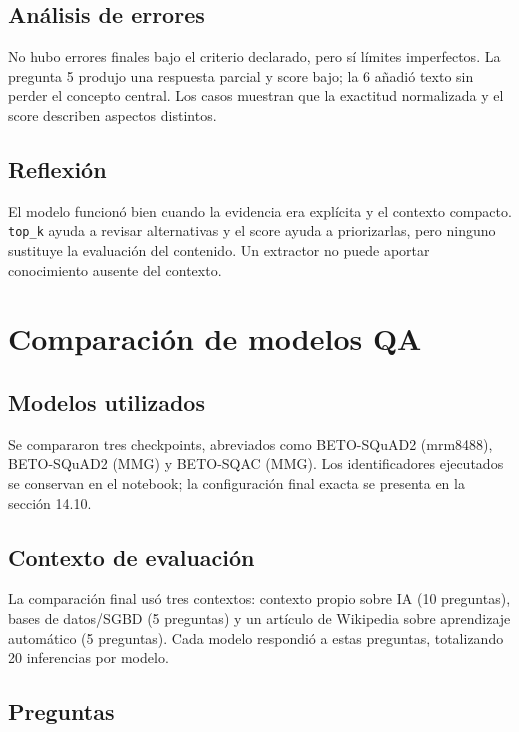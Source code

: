 \documentclass[12pt,letterpaper]{article}
\begin{document}
\subsection{Análisis de errores}

No hubo errores finales bajo el criterio declarado, pero sí límites
imperfectos. La pregunta 5 produjo una respuesta parcial y score bajo; la 6
añadió texto sin perder el concepto central. Los casos muestran que la
exactitud normalizada y el score describen aspectos distintos.

\subsection{Reflexión}

El modelo funcionó bien cuando la evidencia era explícita y el contexto
compacto. \texttt{top\_k} ayuda a revisar alternativas y el score ayuda a
priorizarlas, pero ninguno sustituye la evaluación del contenido. Un extractor
no puede aportar conocimiento ausente del contexto.

\section{Comparación de modelos QA}

\subsection{Modelos utilizados}

Se compararon tres checkpoints, abreviados como BETO-SQuAD2 (mrm8488),
BETO-SQuAD2 (MMG) y BETO-SQAC (MMG). Los identificadores ejecutados se
conservan en el notebook; la configuración final exacta se presenta en la
sección 14.10.

\subsection{Contexto de evaluación}

La comparación final usó tres contextos: contexto propio sobre IA (10 preguntas),
bases de datos/SGBD (5 preguntas) y un artículo de Wikipedia sobre aprendizaje automático (5 preguntas).
Cada modelo respondió a estas preguntas, totalizando 20 inferencias por modelo.

\subsection{Preguntas}
\end{document}
